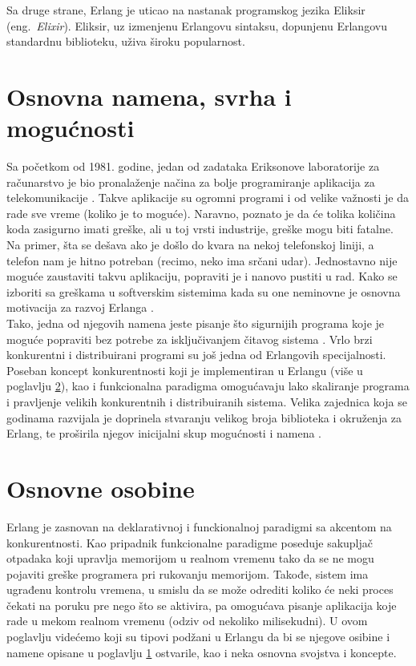 \documentclass[a4paper]{article}
\begin{document}
{Sa druge strane, Erlang je uticao na nastanak programskog jezika Eliksir (eng.~{\em Elixir}). Eliksir,
uz izmenjenu Erlangovu sintaksu, dopunjenu Erlangovu standardnu biblioteku, uživa široku popularnost.

\section{Osnovna namena, svrha i mogućnosti}
\label{sec:namena}

Sa početkom od 1981. godine, jedan od zadataka Eriksonove laboratorije za računarstvo je bio pronalaženje načina za bolje programiranje aplikacija
za telekomunikacije \cite{phdthesis}. Takve aplikacije su ogromni programi i od velike važnosti je da rade sve vreme (koliko je to moguće). 
Naravno, poznato je da će tolika količina koda zasigurno imati greške, ali u toj vrsti industrije, greške mogu biti fatalne. Na primer, 
šta se dešava ako je došlo do kvara na nekoj telefonskoj liniji, a telefon nam je hitno potreban (recimo, neko ima srčani udar).
Jednostavno nije moguće zaustaviti takvu aplikaciju, popraviti je i nanovo pustiti u rad.
Kako se izboriti sa greškama u softverskim sistemima kada su one neminovne je osnovna motivacija za razvoj Erlanga \cite{phdthesis}. \\

Tako, jedna od njegovih namena jeste pisanje što sigurnijih programa koje je moguće popraviti bez potrebe za isključivanjem čitavog sistema \cite{book_joe}.
Vrlo brzi konkurentni i distribuirani programi su još jedna od Erlangovih specijalnosti. 
Poseban koncept konkurentnosti koji je implementiran u Erlangu (više u poglavlju \ref{sec:osobine}), kao i funkcionalna paradigma 
omogućavaju lako skaliranje programa i pravljenje velikih konkurentnih i distribuiranih sistema.
Velika zajednica koja se godinama razvijala je doprinela stvaranju velikog broja biblioteka i okruženja za Erlang, te proširila njegov 
inicijalni skup mogućnosti i namena \cite{book_joe}. 

\section{Osnovne osobine}
\label{sec:osobine}
Erlang je zasnovan na deklarativnoj i funckionalnoj paradigmi sa akcentom na konkurentnosti. Kao pripadnik funkcionalne paradigme poseduje sakupljač otpadaka koji upravlja memorijom u realnom vremenu tako da se ne mogu pojaviti greške programera pri rukovanju memorijom. Takođe, sistem ima ugrađenu kontrolu vremena, u smislu da se može odrediti koliko će neki proces čekati na poruku pre nego što se aktivira, pa omogućava pisanje aplikacija koje rade u mekom realnom vremenu (odziv od nekoliko milisekudni). U ovom poglavlju videćemo koji su tipovi podžani u Erlangu da bi se njegove osibine i namene opisane u poglavlju \ref{sec:namena} ostvarile, kao i neka osnovna svojstva i koncepte.



}
\end{document}
